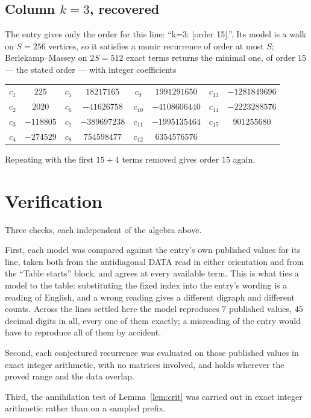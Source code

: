 \documentclass[11pt,a4paper]{article}
\theoremstyle{plain}
\theoremstyle{definition}
\begin{document}
\subsection*{Column $k=3$, recovered}
The entry gives only the order for this line: ``k=3: [order 15].''. Its model is a walk on
$S=256$ vertices, so it satisfies a monic recurrence of order at most $S$;
Berlekamp--Massey on $2S=512$ exact terms returns the minimal one, of order
$15$ --- the stated order --- with integer coefficients
\begin{center}\small\begin{tabular}{cccccccc}
$c_{1}$ & $225$ & $c_{5}$ & $18217165$ & $c_{9}$ & $1991291650$ & $c_{13}$ & $-1281849696$ \\
$c_{2}$ & $2020$ & $c_{6}$ & $-41626758$ & $c_{10}$ & $-4108606440$ & $c_{14}$ & $-2223288576$ \\
$c_{3}$ & $-118805$ & $c_{7}$ & $-389697238$ & $c_{11}$ & $-1995135464$ & $c_{15}$ & $901255680$ \\
$c_{4}$ & $-274529$ & $c_{8}$ & $754598477$ & $c_{12}$ & $6354576576$ &  &  \\
\end{tabular}\end{center}
Repeating with the first $15+4$ terms removed gives order $15$ again.

\section{Verification}

Three checks, each independent of the algebra above.

First, each model was compared against the entry's own published values for its line, taken
both from the antidiagonal DATA read in either orientation and from the ``Table starts''
block, and agrees at every available term. This is what ties a model to the table:
substituting the fixed index into the entry's wording is a reading of English, and a wrong
reading gives a different digraph and different counts. Across the lines settled here the
model reproduces $7$ published values, $45$ decimal digits in all, every one of
them exactly; a misreading of the entry would have to reproduce all of them by accident.

Second, each conjectured recurrence was evaluated on those published values in exact
integer arithmetic, with no matrices involved, and holds wherever the proved range and the
data overlap.

Third, the annihilation test of Lemma~\ref{lem:crit} was carried out in exact integer
arithmetic rather than on a sampled prefix.
\end{document}
